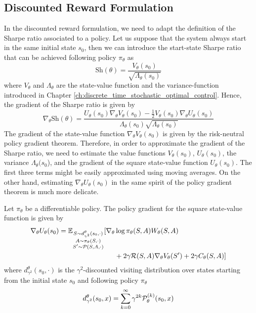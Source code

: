 \subsection{Discounted Reward Formulation}
In the discounted reward formulation, we need to adapt the definition of the Sharpe ratio associated to a policy. Let us suppose that the system always start in the same initial state $s_0$, then we can introduce the start-state Sharpe ratio that can be achieved following policy $\pi_\theta$ as
\begin{equation}
	\text{Sh}(\theta) = \frac{V_\theta(s_0)}{\sqrt{\Lambda_\theta(s_0)}}
\end{equation}
where $V_\theta$ and $\Lambda_\theta$ are the state-value function and the variance-function introduced in Chapter \ref{ch:discrete_time_stochastic_optimal_control}. 
Hence, the gradient of the Sharpe ratio is given by
\begin{equation}
	\nabla_\theta \text{Sh}(\theta) = \frac{U_\theta(s_0) \nabla_\theta V_\theta(s_0) - \frac{1}{2} V_\theta(s_0) \nabla_\theta U_\theta(s_0)}{\Lambda_\theta(s_0) \sqrt{\Lambda_\theta(s_0)}}
\end{equation}
The gradient of the state-value function $\nabla_\theta V_\theta(s_0)$ is given by the risk-neutral policy gradient theorem. Therefore, in order to approximate the gradient of the Sharpe ratio, we need to estimate the value functions $V_\theta(s_0)$, $U_\theta(s_0)$, the variance $\Lambda_\theta(s_0$), and the gradient of the square state-value function $U_\theta (s_0)$. The first three terms might be easily approximated using moving averages. On the other hand, estimating $\nabla_\theta U_\theta(s_0)$ in the same spirit of the policy gradient theorem is much more delicate. 
\begin{theorem}
	Let $\pi_\theta$ be a differentiable policy. The policy gradient for the square state-value function is given by
	\begin{equation}
		\begin{split}
			\nabla_\theta U_\theta(s_0) =
			\mathbb{E}_{\substack{S \sim d_{\gamma^2}^\theta(s_0, \cdot)\\A \sim \pi_\theta(S,\cdot)\\S' \sim \mathcal{P}(S,A,\cdot)}} [\nabla_\theta &\log	\pi_\theta(S,A) W_{\theta}(S, A)\\
			&+ 2 \gamma \mathcal{R}(S,A) \nabla_\theta V_\theta(S') + 2 \gamma C_\theta(S, A) ]
		\end{split}
	\end{equation}
	where $d_{\gamma^2}^\theta(s_0, \cdot)$ is the $\gamma^2$-discounted visiting distribution over states starting from the initial state $s_0$ and following policy $\pi_\theta$
		\begin{equation}
			d_{\gamma^2}^\theta(s_0, x) = \sum_{k=0}^{\infty} \gamma^{2k} \mathcal{P}_\theta^{(k)}(s_0, x)
		\end{equation}
\end{theorem}
